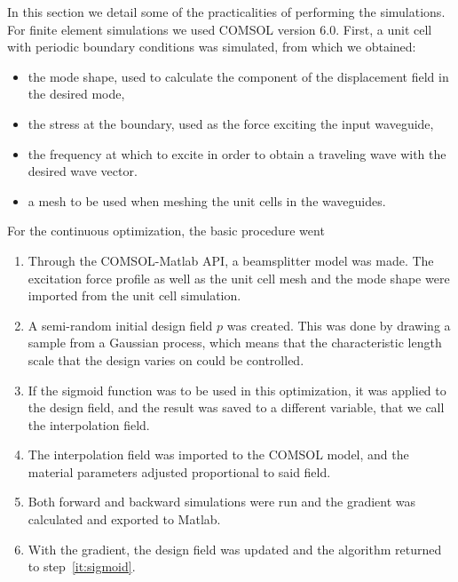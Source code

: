 In this section we detail some of the practicalities of performing the
simulations.
For finite element simulations we used COMSOL version 6.0.
First, a unit cell with periodic boundary conditions was simulated,
from which we obtained:
\begin{itemize}
	\item the mode shape, used to calculate the component of the displacement
		field in the desired mode,
	\item the stress at the boundary, used as the force exciting the input
		waveguide,
	\item the frequency at which to excite in order to obtain a traveling wave
		with the desired wave vector.
	\item a mesh to be used when meshing the unit cells in the waveguides.
\end{itemize}

For the continuous optimization, the basic procedure went
\begin{enumerate}
	\item Through the COMSOL-Matlab API, a beamsplitter model was made.
		The excitation force profile as well as the unit cell mesh and the mode
		shape were imported from the unit cell simulation.
	\item A semi-random initial design field $p$ was created. This was done by
		drawing a sample from a Gaussian process, which means that the characteristic
		length scale that the design varies on could be controlled.
	\item\label{it:sigmoid} If the sigmoid function was to be used in this optimization, it was
		applied to the design field, and the result was saved to a different
		variable, that we call the interpolation field.
	\item The interpolation field was imported to the COMSOL model, and the
		material parameters adjusted proportional to said field.
	\item Both forward and backward simulations were run and the gradient was
		calculated and exported to Matlab.
	\item With the gradient, the design field was updated and the algorithm
		returned to step~\ref{it:sigmoid}.
\end{enumerate}

